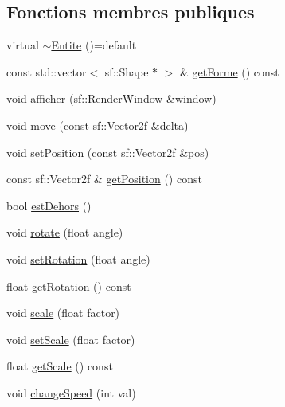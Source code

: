 \subsection*{Fonctions membres publiques}
\begin{DoxyCompactItemize}
\item 
virtual \hyperlink{class_entite_ace3b4604920a7aeba25efb60590e64cb}{$\sim$\+Entite} ()=default
\item 
const std\+::vector$<$ sf\+::\+Shape $\ast$ $>$ \& \hyperlink{class_entite_a0fccfa39c6be09c5ea63fb999fef4c8e}{get\+Forme} () const
\item 
void \hyperlink{class_entite_ad80a88f81ccc689b9abdfa75bd1e99d6}{afficher} (sf\+::\+Render\+Window \&window)
\item 
void \hyperlink{class_entite_a6d77bd5ad9eaf7e7150a4e96448043ec}{move} (const sf\+::\+Vector2f \&delta)
\item 
void \hyperlink{class_entite_a2d97c53ed1b1f6d9c078aa1a89c474fe}{set\+Position} (const sf\+::\+Vector2f \&pos)
\item 
const sf\+::\+Vector2f \& \hyperlink{class_entite_a958fc8d1cfb3b91c6cadd615dbb2abbd}{get\+Position} () const
\item 
bool \hyperlink{class_entite_a4d38790ebb4bf082e20e47355a7b2f0c}{est\+Dehors} ()
\item 
void \hyperlink{class_entite_a620502288a6a0fc619eb4cab0fbe2289}{rotate} (float angle)
\item 
void \hyperlink{class_entite_acefaaf63dfe743c73fba1e6143015827}{set\+Rotation} (float angle)
\item 
float \hyperlink{class_entite_af245a50c73da19510d9a9e52cb9248a4}{get\+Rotation} () const
\item 
void \hyperlink{class_entite_a08e80693f0b1293f5a0ab9d04a5aac0e}{scale} (float factor)
\item 
void \hyperlink{class_entite_a3cfd095f6712461cb8c9baa2f6955088}{set\+Scale} (float factor)
\item 
float \hyperlink{class_entite_a95d64960088b9576b94346acd5ad6296}{get\+Scale} () const
\item 
void \hyperlink{class_entite_a88c148848289e34ca3bc991c37db9b44}{change\+Speed} (int val)
\end{DoxyCompactItemize}
